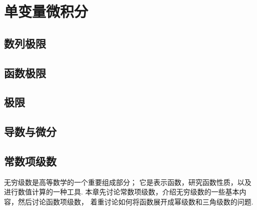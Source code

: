 \part{单变量微积分}


\chapter{数列极限}








\chapter{函数极限}




\chapter{极限}














\chapter{导数与微分}\label{chapter:导数}









\chapter{常数项级数}
无穷级数是高等数学的一个重要组成部分；
它是表示函数，研究函数性质，以及进行数值计算的一种工具.
本章先讨论常数项级数，介绍无穷级数的一些基本内容，然后讨论函数项级数，
着重讨论如何将函数展开成幂级数和三角级数的问题.

